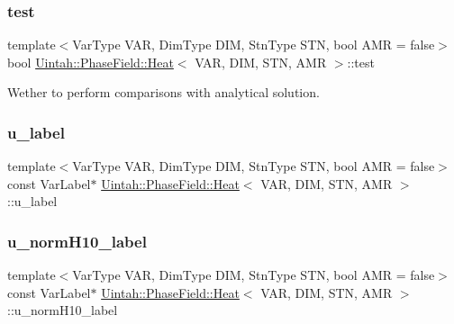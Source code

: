 \mbox{\label{classUintah_1_1PhaseField_1_1Heat_a46a2d7d28834fab61dd63c8c3a2d46a9}} 
\subsubsection{\texorpdfstring{test}{test}}
{\footnotesize\ttfamily template$<$Var\+Type V\+AR, Dim\+Type D\+IM, Stn\+Type S\+TN, bool A\+MR = false$>$ \\
bool \hyperlink{classUintah_1_1PhaseField_1_1Heat}{Uintah\+::\+Phase\+Field\+::\+Heat}$<$ V\+AR, D\+IM, S\+TN, A\+MR $>$\+::test\hspace{0.3cm}{\ttfamily [protected]}}



Wether to perform comparisons with analytical solution. 

\mbox{\label{classUintah_1_1PhaseField_1_1Heat_a8318c248305ac851f69f313697ee3b04}} 
\subsubsection{\texorpdfstring{u\+\_\+label}{u\_label}}
{\footnotesize\ttfamily template$<$Var\+Type V\+AR, Dim\+Type D\+IM, Stn\+Type S\+TN, bool A\+MR = false$>$ \\
const Var\+Label$\ast$ \hyperlink{classUintah_1_1PhaseField_1_1Heat}{Uintah\+::\+Phase\+Field\+::\+Heat}$<$ V\+AR, D\+IM, S\+TN, A\+MR $>$\+::u\+\_\+label\hspace{0.3cm}{\ttfamily [protected]}}

\mbox{\label{classUintah_1_1PhaseField_1_1Heat_acddad73b120372c5929039787359c9fe}} 
\subsubsection{\texorpdfstring{u\+\_\+norm\+H10\+\_\+label}{u\_normH10\_label}}
{\footnotesize\ttfamily template$<$Var\+Type V\+AR, Dim\+Type D\+IM, Stn\+Type S\+TN, bool A\+MR = false$>$ \\
const Var\+Label$\ast$ \hyperlink{classUintah_1_1PhaseField_1_1Heat}{Uintah\+::\+Phase\+Field\+::\+Heat}$<$ V\+AR, D\+IM, S\+TN, A\+MR $>$\+::u\+\_\+norm\+H10\+\_\+label\hspace{0.3cm}{\ttfamily [protected]}}

